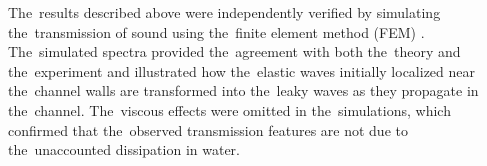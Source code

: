 The~results described above were independently verified by simulating the~transmission of sound using the~finite element method (FEM) \cite{channel2}. %
The~simulated spectra provided the~agreement with both the~theory and the~experiment and illustrated how the~elastic waves initially localized near the~channel walls are transformed into the~leaky waves as they propagate in the~channel.
The~viscous effects were omitted in the~simulations, which confirmed that the~observed transmission features are not due to the~unaccounted dissipation in water.





